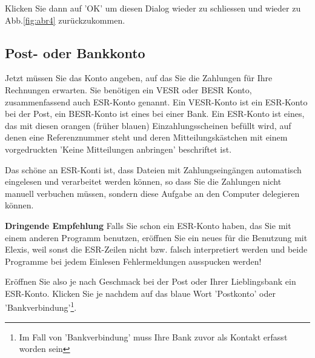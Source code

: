 \documentclass[a4paper]{scrartcl}
\begin{document}
Klicken Sie dann auf 'OK' um diesen Dialog wieder zu schliessen und wieder zu Abb.\ref{fig:abr4} zurückzukommen.


\subsection{Post- oder Bankkonto}
Jetzt müssen Sie das Konto angeben, auf das Sie die Zahlungen für Ihre Rechnungen erwarten. Sie benötigen ein VESR oder BESR Konto, zusammenfassend auch ESR-Konto genannt. Ein VESR-Konto ist ein ESR-Konto bei der Post, ein BESR-Konto ist eines bei einer Bank. Ein ESR-Konto ist eines, das mit diesen orangen (früher blauen) Einzahlungsscheinen befüllt wird, auf denen eine Referenznummer steht und deren Mitteilungskästchen mit einem vorgedruckten 'Keine Mitteilungen anbringen' beschriftet ist.

Das schöne an ESR-Konti ist, dass Dateien mit Zahlungseingängen automatisch eingelesen und verarbeitet werden können, so dass Sie die Zahlungen nicht manuell verbuchen müssen, sondern diese Aufgabe an den Computer delegieren können.

\medskip

 \textbf{Dringende Empfehlung} Falls Sie schon ein ESR-Konto haben, das Sie mit einem anderen Programm benutzen, eröffnen Sie ein neues für die Benutzung mit Elexis, weil sonst die ESR-Zeilen nicht bzw. falsch interpretiert werden und beide Programme bei jedem Einlesen Fehlermeldungen ausspucken werden!

\medskip

Eröffnen Sie also je nach Geschmack bei der Post oder Ihrer Lieblingsbank ein ESR-Konto. Klicken Sie je nachdem auf das blaue Wort 'Postkonto' oder 'Bankverbindung'\footnote{Im Fall von 'Bankverbindung' muss Ihre Bank zuvor als Kontakt erfasst worden sein}.
\end{document}

